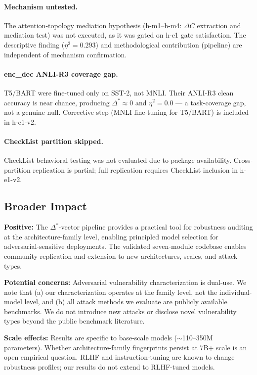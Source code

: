\paragraph{Mechanism untested.}
The attention-topology mediation hypothesis (h-m1--h-m4: $\Delta C$ extraction and mediation
test) was not executed, as it was gated on h-e1 gate satisfaction. The descriptive finding
($\eta^2=0.293$) and methodological contribution (pipeline) are independent of mechanism
confirmation.

\paragraph{enc\_dec ANLI-R3 coverage gap.}
T5/BART were fine-tuned only on SST-2, not MNLI. Their ANLI-R3 clean accuracy is near chance,
producing $\Delta^* \approx 0$ and $\eta^2=0.0$ --- a task-coverage gap, not a genuine null.
Corrective step (MNLI fine-tuning for T5/BART) is included in h-e1-v2.

\paragraph{CheckList partition skipped.}
CheckList behavioral testing was not evaluated due to package availability. Cross-partition
replication is partial; full replication requires CheckList inclusion in h-e1-v2.

\subsection{Broader Impact}

\textbf{Positive:} The $\Delta^*$-vector pipeline provides a practical tool for robustness
auditing at the architecture-family level, enabling principled model selection for
adversarial-sensitive deployments. The validated seven-module codebase enables community
replication and extension to new architectures, scales, and attack types.

\textbf{Potential concerns:} Adversarial vulnerability characterization is dual-use. We note
that (a) our characterization operates at the family level, not the individual-model level, and
(b) all attack methods we evaluate are publicly available benchmarks. We do not introduce new
attacks or disclose novel vulnerability types beyond the public benchmark literature.

\textbf{Scale effects:} Results are specific to base-scale models ($\sim$110--350M parameters).
Whether architecture-family fingerprints persist at 7B+ scale is an open empirical question.
RLHF and instruction-tuning are known to change robustness profiles; our results do not extend
to RLHF-tuned models.
